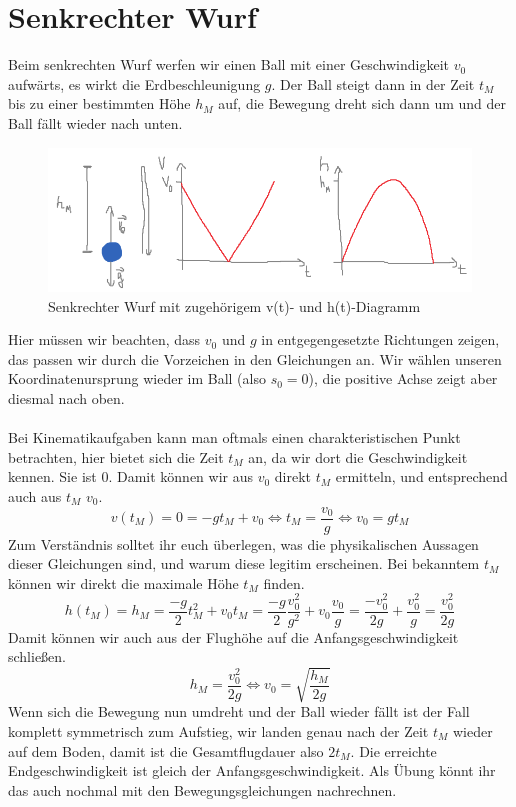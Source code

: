 \documentclass[11pt]{article}
\begin{document}
\section{Senkrechter Wurf}
Beim senkrechten Wurf werfen wir einen Ball mit einer Geschwindigkeit $v_0$ aufwärts, es wirkt die Erdbeschleunigung $g$. Der Ball steigt dann in der Zeit $t_M$ bis zu einer bestimmten Höhe $h_M$ auf, die Bewegung dreht sich dann um und der Ball fällt wieder nach unten. 
\begin{figure}[H] 
    \centering
       \includegraphics[width=\textwidth]{senkrechter-wurf.png}
       \caption{Senkrechter Wurf mit zugehörigem v(t)- und h(t)-Diagramm}
\end{figure} 
Hier müssen wir beachten, dass $v_0$ und $g$ in entgegengesetzte Richtungen zeigen, das passen wir durch die Vorzeichen in den Gleichungen an. Wir wählen unseren Koordinatenursprung wieder im Ball (also $s_0 = 0$), die positive Achse zeigt aber diesmal nach oben. \\\\
Bei Kinematikaufgaben kann man oftmals einen charakteristischen Punkt betrachten, hier bietet sich die Zeit $t_M$ an, da wir dort die Geschwindigkeit kennen. Sie ist 0. Damit können wir aus $v_0$ direkt $t_M$ ermitteln, und entsprechend auch aus $t_M$ $v_0$. 
\begin{equation*}
    v(t_M) = 0 = -gt_M + v_0 \Longleftrightarrow t_M = \frac{v_0}{g} \Longleftrightarrow v_0 = gt_M 
\end{equation*}
Zum Verständnis solltet ihr euch überlegen, was die physikalischen Aussagen dieser Gleichungen sind, und warum diese legitim erscheinen. Bei bekanntem $t_M$ können wir direkt die maximale Höhe $t_M$ finden.
\begin{equation*}
    h(t_M) = h_M = \frac{-g}{2}t_M^2 + v_0t_M = \frac{-g}{2}\frac{v_0^2}{g^2} + v_0\frac{v_0}{g} = \frac{-v_0^2}{2g}+\frac{v_0^2}{g} = \frac{v_0^2}{2g}
\end{equation*}
Damit können wir auch aus der Flughöhe auf die Anfangsgeschwindigkeit schließen.
\begin{equation*}
    h_M = \frac{v_0^2}{2g} \Longleftrightarrow v_0 = \sqrt{\frac{h_M}{2g}}
\end{equation*}
Wenn sich die Bewegung nun umdreht und der Ball wieder fällt ist der Fall komplett symmetrisch zum Aufstieg, wir landen genau nach der Zeit $t_M$ wieder auf dem Boden, damit ist die Gesamtflugdauer also $2t_M$. Die erreichte Endgeschwindigkeit ist gleich der Anfangsgeschwindigkeit. Als Übung könnt ihr das auch nochmal mit den Bewegungsgleichungen nachrechnen. 
\end{document}
